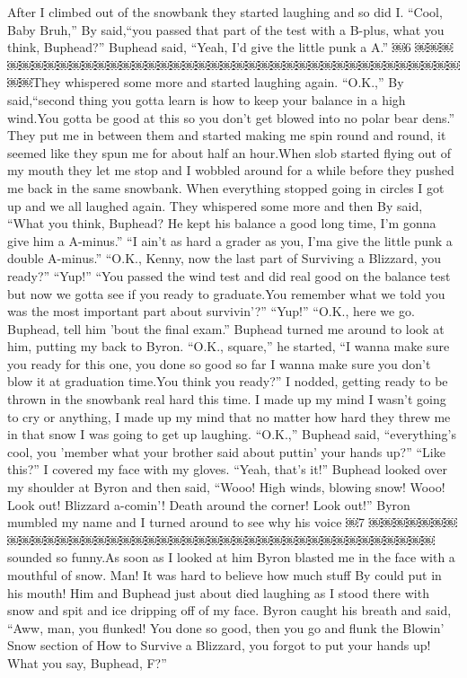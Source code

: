 \documentclass{standard}
\begin{document}
After I climbed out of the snowbank they started laughing and so did I.
“Cool, Baby Bruh,” By said,“you passed that part of the test with a B-plus, what you think, Buphead?”
Buphead said, “Yeah, I’d give the little punk a A.”
￼6
￼￼￼￼￼￼￼￼￼￼￼￼￼￼￼￼￼￼￼￼￼￼￼￼￼￼￼￼￼￼￼￼￼￼￼￼￼￼￼￼￼They whispered some more and started laughing again.
“O.K.,” By said,“second thing you gotta learn is how to keep your balance in a high wind.You gotta be good at this so you don’t get blowed into no polar bear dens.”
They put me in between them and started making me spin round and round, it seemed like they spun me for about half an hour.When slob started flying out of my mouth they let me stop and I wobbled around for a while before they pushed me back in the same snowbank.
When everything stopped going in circles I got up and we all laughed again.
They whispered some more and then By said, “What you think, Buphead? He kept his balance a good long time, I’m gonna give him a A-minus.”
“I ain’t as hard a grader as you, I’ma give the little punk a double A-minus.”
“O.K., Kenny, now the last part of Surviving a Blizzard, you ready?” “Yup!”
“You passed the wind test and did real good on the balance test but
now we gotta see if you ready to graduate.You remember what we told you was the most important part about survivin’?”
“Yup!”
“O.K., here we go. Buphead, tell him ’bout the final exam.” Buphead turned me around to look at him, putting my back to
Byron. “O.K., square,” he started, “I wanna make sure you ready for this one, you done so good so far I wanna make sure you don’t blow it at graduation time.You think you ready?”
I nodded, getting ready to be thrown in the snowbank real hard this time. I made up my mind I wasn’t going to cry or anything, I made up my mind that no matter how hard they threw me in that snow I was going to get up laughing.
“O.K.,” Buphead said, “everything’s cool, you ’member what your brother said about puttin’ your hands up?”
“Like this?” I covered my face with my gloves.
“Yeah, that’s it!” Buphead looked over my shoulder at Byron and then said, “Wooo! High winds, blowing snow! Wooo! Look out! Blizzard a-comin’! Death around the corner! Look out!”
Byron mumbled my name and I turned around to see why his voice
￼7
￼￼￼￼￼￼￼￼￼￼￼￼￼￼￼￼￼￼￼￼￼￼￼￼￼￼￼￼￼￼￼￼￼￼￼￼￼￼￼￼￼sounded so funny.As soon as I looked at him Byron blasted me in the face with a mouthful of snow.
Man! It was hard to believe how much stuff By could put in his mouth! Him and Buphead just about died laughing as I stood there with snow and spit and ice dripping off of my face.
Byron caught his breath and said, “Aww, man, you flunked! You done so good, then you go and flunk the Blowin’ Snow section of How to Survive a Blizzard, you forgot to put your hands up! What you say, Buphead, F?”
\end{document}
